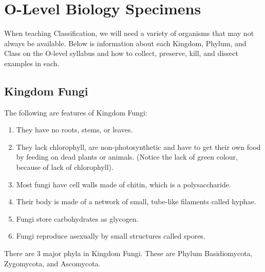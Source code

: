 \pagebreak

\setcounter{secnumdepth}{3}


\section{O-Level Biology Specimens}  

When teaching Classification, we will need a variety of organisms that may not always be available. Below is information about each Kingdom, Phylum, and Class on the O-level syllabus  and how to collect, preserve, kill, and dissect examples in each.

\subsection{Kingdom Fungi} 
The following are features of Kingdom Fungi:
\begin{enumerate}
\item{They have no roots, stems, or leaves.}
\item{They lack chlorophyll, are non-photosynthetic and have to get their own food by feeding on dead plants or animals. (Notice the lack of green colour, because of lack of chlorophyll)}.
\item{Most fungi have cell walls made of chitin, which is a polysaccharide.}
\item{Their body is made of a network of small, tube-like filaments called hyphae.}
\item{Fungi store carbohydrates as glycogen.}
\item{Fungi reproduce asexually by small structures called spores.} 
\end{enumerate}

There are 3 major phyla in Kingdom Fungi. These are Phylum Basidiomycota, Zygomycota, and Ascomycota.

